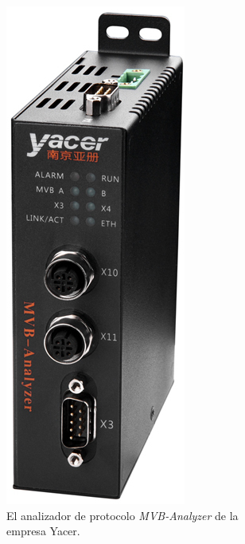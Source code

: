 \begin{figure}[htbp!]
	\centering
    \begin{subfigure}[b]{0.45\textwidth}
        \centering
        \includegraphics[height=17\baselineskip]{./Figures/yacer.jpg}
        \caption[Yacer -- MVB-Analyzer]{El analizador de protocolo \textit{MVB-Analyzer} de la empresa Yacer.}
        \label{fig:yacer}
    \end{subfigure}
    \hfill
    \begin{subfigure}[b]{0.45\textwidth}
        \centering

\end{subfigure}
\end{figure}
